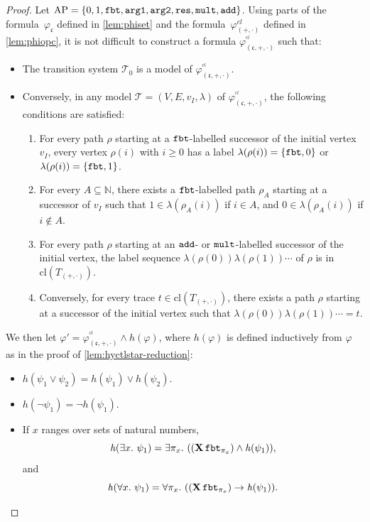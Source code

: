 \documentclass[dvipsnames,10pt,a4paper]{amsart}
\theoremstyle{definition}
\theoremstyle{remark}
\newcommand{\nats}{\mathbb{N}}
\renewcommand{\phi}{\varphi}
\newcommand\Nat{\nats}
\newcommand{\cont}{\mathfrak{c}}
\newcommand{\tsys}{\mathcal{T}}
\newcommand{\initmark}{I}
\newcommand{\X}{\mathop{\mathbf{X}\vphantom{a}}\nolimits}
\newcommand\AP{\textup{AP}}
\newcommand\argl{\textup{\texttt{arg1}}}
\newcommand\argr{\textup{\texttt{arg2}}}
\newcommand\res{\textup{\texttt{res}}}
\newcommand\add{\textup{\texttt{add}}}
\newcommand\mult{\textup{\texttt{mult}}}
\newcommand\fbt{\textup{\texttt{fbt}}}
\newcommand\phiop{\varphi_{({+},{\cdot})}}
\newcommand\Top{T_{({+},{\cdot})}}
\newcommand\phiset{\varphi_{\cont}}
\newcommand\pix[1]{\pi_{#1}}
\newcommand\phiz{\varphi_{(\cont,{+},{\cdot})}}
\newcommand\phizc{\phiz^{^{cl}}}
\newcommand\tr [1]{\mathit{h}(#1)}
\renewcommand{\phi}{\varphi}
\newcommand\tsysc{\tsys_0}
\newcommand{\closure}[1]{\mathrm{cl}(#1)}
\newcommand{\phiopc}{\phiop^{cl}}
\begin{document}
\begin{proof}
  \smallskip
  
  Let $\AP = \{0,1,\fbt,\argl,\argr,\res,\mult,\add\}$.
  Using parts of the formula~$\phiset$ defined in \autoref{lem:phiset}
  and the formula~$\phiopc$ defined in \autoref{lem:phiopc}, it is not difficult to construct a formula
  $\phizc$ such that:
  \begin{itemize}
  \item The transition system $\tsysc$ is a model of $\phizc$.
  \item Conversely, in any model $\tsys = (V,E,v_\initmark, \lambda)$ of $\phizc$, the following conditions
    are satisfied:
  \begin{enumerate}
    \item
      For every path $\rho$ starting at a $\fbt$-labelled successor of
      the initial vertex $v_\initmark$, every vertex $\rho(i)$ with $i \ge 0$ has a label
      $\lambda(\rho(i)) = \{\fbt,0\}$ or $\lambda(\rho(i)) = \{\fbt,1\}$.
      
    \item For every $A \subseteq \Nat$, there exists a $\fbt$-labelled path
      $\rho_A$ starting at a successor of $v_\initmark$ 
      such that $1 \in \lambda(\rho_A(i))$ if  $i \in A$,
      and $0 \in \lambda(\rho_A(i))$ if  $i \notin A$.
     \item For every path $\rho$ starting at an $\add$- or $\mult$-labelled
      successor of the initial vertex, the label sequence
      $\lambda(\rho(0)) \lambda(\rho(1)) \cdots$ of $\rho$ is in $\closure{\Top}$.

    \item Conversely, for every trace $t \in \closure{\Top}$, there exists a path
      $\rho$ starting at a successor of the initial vertex such that
      $\lambda(\rho(0)) \lambda(\rho(1)) \cdots = t$.
    \end{enumerate}
  \end{itemize}

  We then let $\varphi' = \phizc  \land \tr  \varphi$, where $\tr  \phi$ is defined inductively from $\varphi$ as in the proof of \autoref{lem:hyctlstar-reduction}:
  \begin{itemize}
  \item $\tr {\psi_1 \lor \psi_2} = \tr {\psi_1} \lor \tr {\psi_2}$.
  \item 
    $\tr {\lnot \psi_1} = \lnot \tr {\psi_1}$.
  \item If $x$ ranges over sets of natural numbers,
    \[\tr {\exists x.\ \psi_1} =
    \exists \pix x.\ ((\X \fbt_{\pix x}) \land \tr  {\psi_1}),\]
    and
    \[\tr {\forall x.\ \psi_1} =
    \forall \pix x.\ ((\X \fbt_{\pix x}) \rightarrow \tr  {\psi_1}).\]


\end{itemize}
\end{proof}
\end{document}
